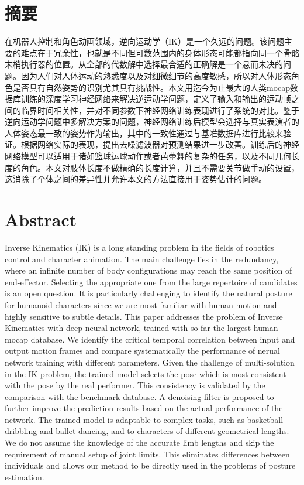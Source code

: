 \chapter*{摘要}
在机器人控制和角色动画领域，逆向运动学（IK）是一个久远的问题。该问题主要的难点在于冗余性，也就是不同但可数范围内的身体形态可能都指向同一个骨骼末梢执行器的位置。从全部的代数解中选择最合适的正确解是一个悬而未决的问题。因为人们对人体运动的熟悉度以及对细微细节的高度敏感，所以对人体形态角色是否具有自然姿势的识别尤其具有挑战性。本文用迄今为止最大的人类mocap数据库训练的深度学习神经网络来解决逆运动学问题，定义了输入和输出的运动帧之间的临界时间相关性，并对不同参数下神经网络训练表现进行了系统的对比。鉴于逆向运动学问题中多解决方案的问题，神经网络训练后模型会选择与真实表演者的人体姿态最一致的姿势作为输出，其中的一致性通过与基准数据库进行比较来验证。根据网络实际的表现，提出去噪滤波器对预测结果进一步改善。训练后的神经网络模型可以适用于诸如篮球运球动作或者芭蕾舞的复杂的任务，以及不同几何长度的角色。本文对肢体长度不做精确的长度计算，并且不需要关节做手动的设置，这消除了个体之间的差异性并允许本文的方法直接用于姿势估计的问题。


\clearpage

\chapter*{Abstract}

Inverse Kinematics (IK) is a long standing problem in the ﬁelds of robotics control and character animation. The main challenge lies in the redundancy, where an inﬁnite number of body conﬁgurations may reach the same position of end-effector. Selecting the appropriate one from the large repertoire of candidates is an open question. It is particularly challenging to identify the natural posture for humanoid characters since we are most familiar with human motion and highly sensitive to subtle details. This paper addresses the problem of Inverse Kinematics with deep neural network, trained with so-far the largest human mocap database. We identify the critical temporal correlation between input and output motion frames and compare systematically the performance of nerual network training with different parameters. Given the challenge of multi-solution in the IK problem, the trained model selects the pose which is most consistent with the pose by the real performer. This consistency is validated by the comparison with the benchmark database. A denoising filter is proposed to further improve the prediction results based on the actual performance of the network. The trained model is adaptable to complex tasks, such as basketball dribbling and ballet dancing, and to characters of different geometrical lengths. We do not assume the knowledge of the accurate limb lengths and skip the requirement of manual setup of joint limits. This  eliminates differences between individuals and allows our method to be directly used in the problems of posture estimation.


\cleardoublepage
